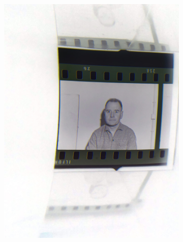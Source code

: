 \begin{figure}[H]
\begin{subfigure}{0.24\textwidth}
        \includegraphics[width=\linewidth]{Illustrations/P4.jpg}
        \caption{}
    \end{subfigure}
    \begin{subfigure}{0.20\textwidth}

\end{subfigure}
\end{figure}
